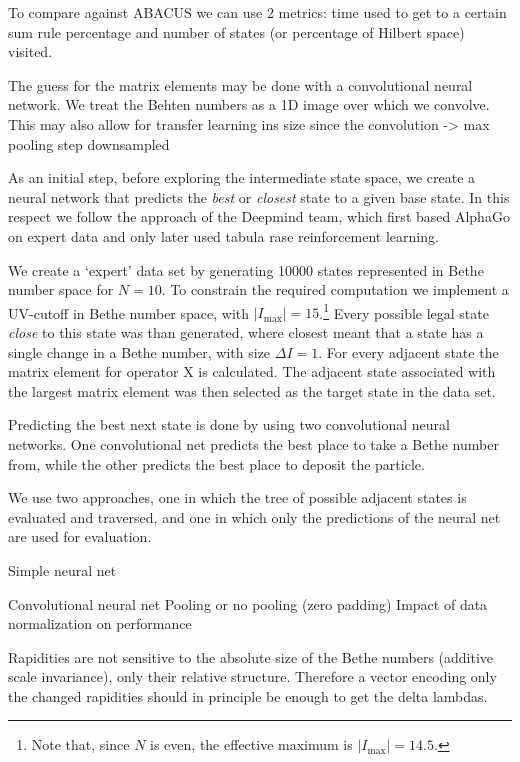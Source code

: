 \documentclass[11pt, a4paper]{report} %
\begin{document}
To compare against ABACUS we can use 2 metrics:
time used to get to a certain sum rule percentage and number of states (or percentage of Hilbert space) visited.

The guess for the matrix elements may be done with a convolutional neural network.
We treat the Behten numbers as a 1D image over which we convolve.
This may also allow for transfer learning ins size since the convolution -> max pooling step downsampled



As an initial step, before exploring the intermediate state space, we create a neural network that predicts the \textit{best} or \textit{closest} state to a given base state.
In this respect we follow the approach of the Deepmind team, which first based AlphaGo on expert data and only later used tabula rase reinforcement learning.

We create a `expert' data set by generating 10000 states represented in Bethe number space for $N=10$.
To constrain the required computation we implement a UV-cutoff in Bethe number space, with $\lvert I_{\max}\rvert=15$.\footnote{Note that, since $N$ is even, the effective maximum is $\lvert I_{\max}\rvert=14.5$.}
Every possible legal state \textit{close} to this state was than generated, where closest meant that a state has a single change in a Bethe number, with size $\Delta I = 1$.
For every adjacent state the matrix element for operator X is calculated.
The adjacent state associated with the largest matrix element was then selected as the target state in the data set.

Predicting the best next state is done by using two convolutional neural networks.
One convolutional net predicts the best place to take a Bethe number from, while the other predicts the best place to deposit the particle.


We use two approaches, one in which the tree of possible adjacent states is evaluated and traversed, and one in which only the predictions of the neural net are used for evaluation.

Simple neural net


Convolutional neural net
Pooling or no pooling (zero padding) 
Impact of data normalization on performance


Rapidities are not sensitive to the absolute size of the Bethe numbers (additive scale invariance), only their relative structure.
Therefore a vector encoding only the changed rapidities should in principle be enough to get the delta lambdas.
\end{document}
